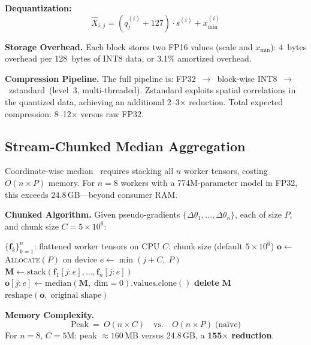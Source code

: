 \documentclass[10pt,conference]{IEEEtran}
\begin{document}
\textbf{Dequantization:}
\begin{equation}
  \hat{X}_{i,j} = (q_j^{(i)} + 127) \cdot s^{(i)} + x_{\min}^{(i)}
  \label{eq:dequantize}
\end{equation}

\textbf{Storage Overhead.} Each block stores two FP16 values (scale and
$x_{\min}$): $4$~bytes overhead per 128~bytes of INT8 data, or 3.1\%
amortized overhead.

\textbf{Compression Pipeline.} The full pipeline is: FP32~$\to$~block-wise
INT8~$\to$~zstandard~(level~3, multi-threaded). Zstandard exploits spatial
correlations in the quantized data, achieving an additional 2--3$\times$
reduction. Total expected compression: 8--12$\times$ versus raw FP32.

\subsection{Stream-Chunked Median Aggregation}
\label{sec:chunked-median}

Coordinate-wise median~\cite{yin2018byzantine} requires stacking all $n$
worker tensors, costing $O(n \times P)$ memory. For $n{=}8$ workers with a
774M-parameter model in FP32, this exceeds 24.8\,GB---beyond consumer RAM.

\textbf{Chunked Algorithm.} Given pseudo-gradients
$\{\Delta\theta_1, \ldots, \Delta\theta_n\}$, each of size $P$, and chunk
size $C{=}5{\times}10^6$:

\begin{algorithm}[h]
\caption{Stream-Chunked Coordinate-Wise Median}
\label{alg:chunked-median}
\begin{algorithmic}[1]
\REQUIRE $\{\mathbf{f}_k\}_{k=1}^{n}$: flattened worker tensors on CPU
\REQUIRE $C$: chunk size (default $5{\times}10^6$)
\STATE $\mathbf{o} \leftarrow$ \textsc{Allocate}$(P)$ on device
  \STATE $e \leftarrow \min(j + C,\; P)$
  \STATE $\mathbf{M} \leftarrow \text{stack}(\mathbf{f}_1[j{:}e], \ldots,
    \mathbf{f}_n[j{:}e])$
  \STATE $\mathbf{o}[j{:}e] \leftarrow
    \text{median}(\mathbf{M},\;\text{dim}{=}0).\text{values}.\text{clone}()$
  \STATE \textbf{delete} $\mathbf{M}$
\ENDFOR
\RETURN $\text{reshape}(\mathbf{o},\;\text{original shape})$
\end{algorithmic}
\end{algorithm}

\textbf{Memory Complexity.}
\begin{equation}
  \text{Peak}\ =\ O(n \times C) \quad \text{vs.}\quad O(n \times P)
  \;\text{(na\"ive)}
  \label{eq:mem-chunked}
\end{equation}
For $n{=}8$, $C{=}5\text{M}$: peak $\approx 160$\,MB versus 24.8\,GB,
a \textbf{155$\times$ reduction}.
\end{document}
